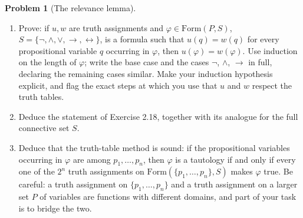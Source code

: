\documentclass[11pt]{article}
\newcommand{\Form}{\mathrm{Form}}
\newcommand{\Sfive}{\{\lnot,\land,\lor,\to,\leftrightarrow\}}
\theoremstyle{definition}
\newtheorem{problem}{Problem}
\begin{document}
\begin{problem}[The relevance lemma]
\begin{enumerate}
\item[(a)] Prove: if $u,w$ are truth assignments and $\varphi\in\Form(P,S)$,
$S=\Sfive$, is a formula such that $u(q)=w(q)$ for every propositional variable
$q$ occurring in $\varphi$, then $u(\varphi)=w(\varphi)$. Use induction on the
length of $\varphi$; write the base case and the cases $\lnot$, $\land$, $\to$ in
full, declaring the remaining cases similar. Make your induction hypothesis
explicit, and flag the exact steps at which you use that $u$ and $w$ respect the
truth tables.
\item[(b)] Deduce the statement of Exercise 2.18, together with its analogue for
the full connective set $S$.
\item[(c)] Deduce that the truth-table method is sound: if the propositional
variables occurring in $\varphi$ are among $p_1,\dots,p_n$, then $\varphi$ is a
tautology if and only if every one of the $2^n$ truth assignments on
$\Form(\{p_1,\dots,p_n\},S)$ makes $\varphi$ true. Be careful: a truth assignment
on $\{p_1,\dots,p_n\}$ and a truth assignment on a larger set $P$ of variables are
functions with different domains, and part of your task is to bridge the two.
\end{enumerate}
\end{problem}
\end{document}
